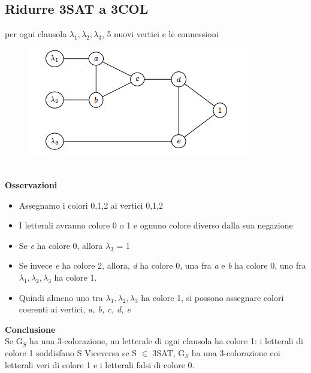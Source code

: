 \subsection{Ridurre 3SAT a 3COL}
per ogni clausola $\lambda_1, \lambda_2, \lambda_3$, 5 nuovi vertici e le connessioni
\begin{figure}[htp]
    \centering
    \includegraphics[scale=0.9]{tesi_stile/img/foto6cap13.png}
\end{figure}\\
\textbf{Osservazioni}\\
\begin{itemize}
    \item Assegnamo i colori 0,1,2 ai vertici 0,1,2
    
    \item I letterali avranno colore 0 o 1 e ognuno colore diverso dalla sua negazione
    
    \item Se \textit{e} ha colore 0, allora $\lambda_3$ = 1
    
    \item Se invece \textit{e} ha colore 2, allora, \textit{d} ha colore 0, una fra \textit{a} e \textit{b} ha colore 0, uno fra $\lambda_1, \lambda_2, \lambda_3$ ha colore 1.
    
    \item Quindi almeno uno tra $\lambda_1, \lambda_2, \lambda_3$ ha colore 1, si possono assegnare colori coerenti ai vertici, \textit{a, b, c, d, e}
\end{itemize}
\textbf{Conclusione}\\
Se G$_S$ ha una 3-colorazione, un letterale di ogni clausola ha colore 1: i letterali di colore 1 soddisfano S
Viceversa se S $\in$ 3SAT, G$_S$ ha una 3-colorazione coi letterali veri di colore 1 e i letterali falsi di colore 0.
\newpage
